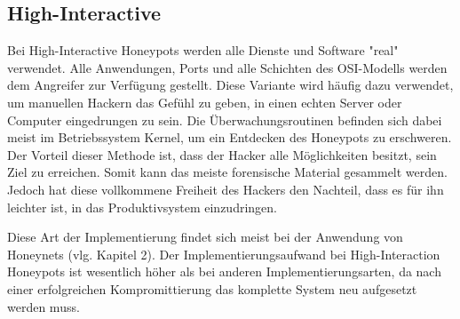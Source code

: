 \subsection{High-Interactive}
Bei High-Interactive Honeypots werden alle Dienste und Software "real" verwendet. Alle Anwendungen, Ports und alle Schichten des OSI-Modells werden dem Angreifer zur Verfügung gestellt. Diese Variante wird häufig dazu verwendet, um manuellen Hackern das Gefühl zu geben, in einen echten Server oder Computer eingedrungen zu sein. Die Überwachungsroutinen befinden sich dabei meist im Betriebssystem Kernel, um ein Entdecken des Honeypots zu erschweren. Der Vorteil dieser Methode ist, dass der Hacker alle Möglichkeiten besitzt, sein Ziel zu erreichen. Somit kann das meiste forensische Material gesammelt werden. Jedoch hat diese vollkommene Freiheit des Hackers den Nachteil, dass es für ihn leichter ist, in das Produktivsystem einzudringen. 

Diese Art der Implementierung findet sich meist bei der Anwendung von Honeynets (vlg. Kapitel 2). Der Implementierungsaufwand bei High-Interaction Honeypots ist wesentlich höher als bei anderen Implementierungsarten, da nach einer erfolgreichen Kompromittierung das komplette System neu aufgesetzt werden muss.

